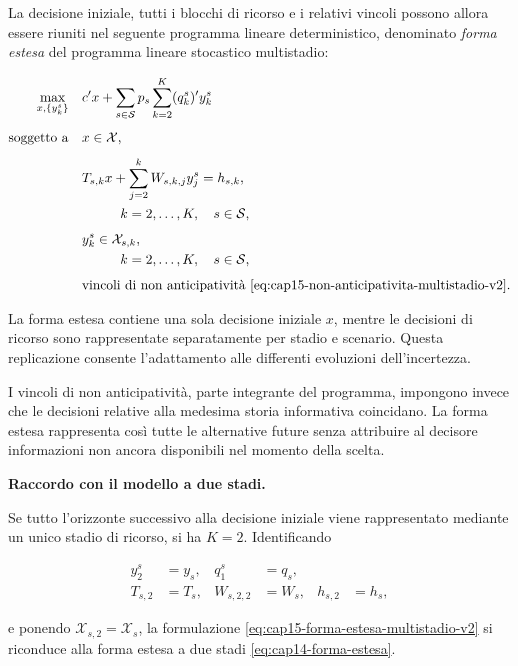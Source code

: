 La decisione iniziale,
tutti i blocchi di ricorso
e i relativi vincoli possono
allora essere riuniti
nel seguente programma
lineare deterministico,
denominato \emph{forma estesa}
del programma lineare
stocastico multistadio:

\begin{equation}
\begin{aligned}
\max_{x,\{y_k^s\}}
\quad&
c'x+
\sum_{s\in\mathcal S}p_s
\sum_{k=2}^{K}(q_k^s)'y_k^s
\\[4pt]
\text{soggetto a}\quad&
x\in\mathcal X,
\\[4pt]
&
T_{s,k}x+
\sum_{j=2}^{k}W_{s,k,j}y_j^s
=h_{s,k},
\\
&
\hspace{1cm}
k=2,\ldots,K,\quad s\in\mathcal S,
\\[4pt]
&
y_k^s\in\mathcal X_{s,k},
\\
&
\hspace{1cm}
k=2,\ldots,K,\quad s\in\mathcal S,
\\[4pt]
&
\text{vincoli di non anticipativit\`a
\eqref{eq:cap15-non-anticipativita-multistadio-v2}.}
\end{aligned}
\label{eq:cap15-forma-estesa-multistadio-v2}
\end{equation}

La forma estesa contiene
una sola decisione iniziale $x$,
mentre le decisioni di ricorso
sono rappresentate separatamente
per stadio e scenario.
Questa replicazione consente
l'adattamento alle differenti
evoluzioni dell'incertezza.

I vincoli di non anticipativit\`a,
parte integrante del programma,
impongono invece che le decisioni
relative alla medesima storia
informativa coincidano.
La forma estesa rappresenta
cos\`i tutte le alternative
future senza attribuire
al decisore informazioni
non ancora disponibili
nel momento della scelta.

\medskip

\noindent
\textbf{Raccordo con il modello a due stadi.}

Se tutto l'orizzonte successivo
alla decisione iniziale viene
rappresentato mediante un unico
stadio di ricorso, si ha $K=2$.
Identificando

\[
\begin{aligned}
y_2^s&=y_s,
&
q_1^s&=q_s,
\\[4pt]
T_{s,2}&=T_s,
&
W_{s,2,2}&=W_s,
&
h_{s,2}&=h_s,
\end{aligned}
\]

e ponendo
$\mathcal X_{s,2}=\mathcal X_s$,
la formulazione
\eqref{eq:cap15-forma-estesa-multistadio-v2}
si riconduce alla forma estesa
a due stadi
\eqref{eq:cap14-forma-estesa}.

